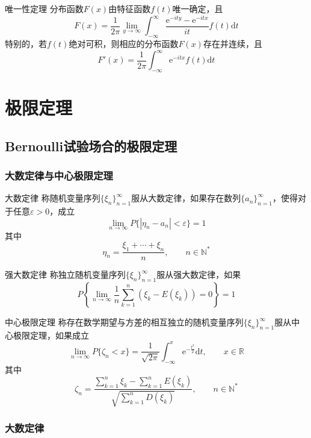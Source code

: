 \documentclass[lang = cn, scheme = chinese, thmcnt = section]{elegantbook}
\newcommand{\N}{\mathbb{N}}            %
\newcommand{\R}{\mathbb{R}}            %
\newcommand{\dis}{\displaystyle}
\begin{document}
\begin{theorem}{唯一性定理}
	分布函数$F(x)$由特征函数$f(t)$唯一确定，且
	$$
	F(x)=\frac{1}{2\pi}\lim_{y\to\infty}{\int_{-\infty}^{\infty}{\frac{\mathrm{e}^{-ity}-\mathrm{e}^{-itx}}{it}f(t)\mathrm{d}t}}
	$$
	特别的，若$f(t)$绝对可积，则相应的分布函数$F(x)$存在并连续，且
	$$
	F'(x)=\frac{1}{2\pi}\int_{-\infty}^{\infty}{\mathrm{e}^{-itx}f(t)\mathrm{d}t}
	$$
\end{theorem}

\chapter{极限定理}

\section{Bernoulli试验场合的极限定理}

\subsection{大数定律与中心极限定理}

\begin{definition}{大数定律}
	称随机变量序列$\{ \xi_n \}_{n=1}^{\infty}$服从大数定律，如果存在数列$\{ a_n \}_{n=1}^{\infty}$，使得对于任意$\varepsilon>0$，成立%
	$$
	\lim_{n\to\infty}{P\{ | \eta_n-a_n | <\varepsilon\}}=1
	$$
	其中
	$$
	\eta_n=\frac{\xi_1+\cdots+\xi_n}{n},\qquad n\in\N^*
	$$
\end{definition}

\begin{definition}{强大数定律}
	称独立随机变量序列$\{ \xi_n \}_{n=1}^{\infty}$服从强大数定律，如果
	$$
	P\left\{\lim_{n\to\infty}\frac{1}{n}{\sum_{k=1}^{n}{(\xi_k-E(\xi_k))}}=0\right\}=1
	$$
\end{definition}

\begin{definition}{中心极限定理}
	称存在数学期望与方差的相互独立的随机变量序列$\{ \xi_n \}_{n=1}^{\infty}$服从中心极限定理，如果成立%
	$$
	\lim_{n\to\infty}{P\{\zeta_n<x\}}=\frac{1}{\sqrt{2\pi}}\int_{-\infty}^{x}{\mathrm{e}^{-\frac{t^2}{2}}\mathrm{d}t},\qquad x\in\R
	$$
	其中
	$$
	\zeta_n=\frac{\dis\sum_{k=1}^{n}{\xi_k}-\sum_{k=1}^{n}{E(\xi_k)}}{\dis\sqrt{\sum_{k=1}^{n}{D(\xi_k)}}},\qquad n\in\N^*
	$$
\end{definition}

\subsection{大数定律}
\end{document}
